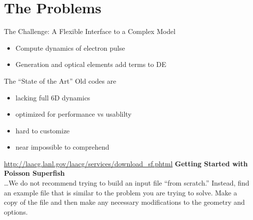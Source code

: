\documentclass[mathserif]{beamer}
\begin{document}
\section{The Problems}

\begin{frame}{The Challenge: A Flexible Interface to a Complex Model}
  \begin{itemize}
    \item Compute dynamics of electron pulse
    \item Generation and optical elements add terms to DE
  \end{itemize}
\end{frame}

\begin{frame}{The ``State of the Art''}
  Old codes are
  \begin{itemize}
    \item lacking full 6D dynamics
    \item optimized for performance vs usablilty
    \item hard to customize
    \item near impossible to comprehend
  \end{itemize}
  \begin{block}{\url{http://laacg.lanl.gov/laacg/services/download_sf.phtml}}
    \textbf{Getting Started with Poisson Superfish}\\
    \ldots We do not recommend trying to build an input file ``from scratch.'' Instead, find an example file that is similar to the problem you are trying to solve. Make a copy of the file and then make any necessary modifications to the geometry and options.
  \end{block}
\end{frame}
\end{document}
